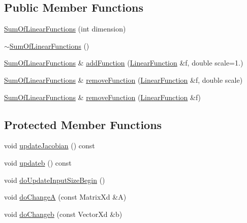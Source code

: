 \subsection*{Public Member Functions}
\begin{DoxyCompactItemize}
\item 
\hyperlink{classocra_1_1SumOfLinearFunctions_a70b277cb77618691688b7b6151ec126d}{Sum\+Of\+Linear\+Functions} (int dimension)
\item 
\hyperlink{classocra_1_1SumOfLinearFunctions_a0ca0f87d5eee6117cd521130a831d90e}{$\sim$\+Sum\+Of\+Linear\+Functions} ()
\item 
\hyperlink{classocra_1_1SumOfLinearFunctions}{Sum\+Of\+Linear\+Functions} \& \hyperlink{classocra_1_1SumOfLinearFunctions_a9ab412e1232557d36a84145360d57da7}{add\+Function} (\hyperlink{classocra_1_1LinearFunction}{Linear\+Function} \&f, double scale=1.)
\item 
\hyperlink{classocra_1_1SumOfLinearFunctions}{Sum\+Of\+Linear\+Functions} \& \hyperlink{classocra_1_1SumOfLinearFunctions_a2d3525455d1f4d2c19c7a72a33d1d600}{remove\+Function} (\hyperlink{classocra_1_1LinearFunction}{Linear\+Function} \&f, double scale)
\item 
\hyperlink{classocra_1_1SumOfLinearFunctions}{Sum\+Of\+Linear\+Functions} \& \hyperlink{classocra_1_1SumOfLinearFunctions_af22a2dd5debe1c87a4e3e664727e8754}{remove\+Function} (\hyperlink{classocra_1_1LinearFunction}{Linear\+Function} \&f)
\end{DoxyCompactItemize}
\subsection*{Protected Member Functions}
\begin{DoxyCompactItemize}
\item 
void \hyperlink{classocra_1_1SumOfLinearFunctions_a51487ee34ad8dd8b92e5207f567770bb}{update\+Jacobian} () const 
\item 
void \hyperlink{classocra_1_1SumOfLinearFunctions_a19125365dbadc7ba6eabb7c13b78ba20}{updateb} () const 
\item 
void \hyperlink{classocra_1_1SumOfLinearFunctions_a7cfc7b9339509922c2ea6173d4d4d141}{do\+Update\+Input\+Size\+Begin} ()
\item 
void \hyperlink{classocra_1_1SumOfLinearFunctions_a49346ac5b041b40540ce0c1ae5a6b0d2}{do\+ChangeA} (const Matrix\+Xd \&A)
\item 
void \hyperlink{classocra_1_1SumOfLinearFunctions_ab66be55a88e1c4e7d4e6f663f0a36683}{do\+Changeb} (const Vector\+Xd \&b)
\end{DoxyCompactItemize}
